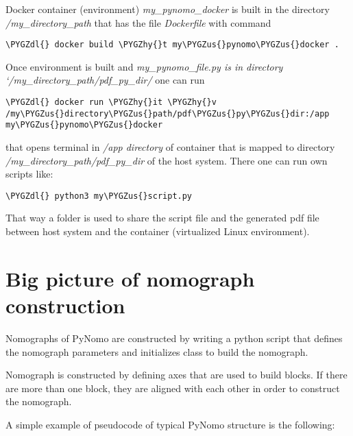 \documentclass[a4paper,11pt,english]{sphinxmanual}
\def\PYGZus{\char`\_}
\def\PYGZdl{\char`\$}
\def\PYGZhy{\char`\-}
\begin{document}
Docker container (environment) \emph{my\_pynomo\_docker} is built in the directory \emph{/my\_directory\_path} that has the file \emph{Dockerfile} with command

\begin{Verbatim}[commandchars=\\\{\},formatcom=\scriptsize]
\PYGZdl{} docker build \PYGZhy{}t my\PYGZus{}pynomo\PYGZus{}docker .
\end{Verbatim}

Once environment is built and \emph{my\_pynomo\_file.py is in directory {}`/my\_directory\_path/pdf\_py\_dir/} one can run

\begin{Verbatim}[commandchars=\\\{\},formatcom=\scriptsize]
\PYGZdl{} docker run \PYGZhy{}it \PYGZhy{}v /my\PYGZus{}directory\PYGZus{}path/pdf\PYGZus{}py\PYGZus{}dir:/app my\PYGZus{}pynomo\PYGZus{}docker
\end{Verbatim}

that opens terminal in \emph{/app directory} of container that is mapped to directory \emph{/my\_directory\_path/pdf\_py\_dir} of the host system.
There one can run own scripts like:

\begin{Verbatim}[commandchars=\\\{\},formatcom=\scriptsize]
\PYGZdl{} python3 my\PYGZus{}script.py
\end{Verbatim}

That way a folder is used to share the script file and the generated pdf file between host system and the container (virtualized
Linux environment).


\chapter{Big picture of nomograph construction}
\label{main_page:big-picture-of-nomograph-construction}\label{main_page::doc}
Nomographs of PyNomo are
constructed by writing a python script that defines the nomograph parameters and
initializes class  to build the nomograph.

Nomograph is constructed by defining axes that are used to
build blocks. If there are more than one block,  they are aligned with each other in order to
construct the nomograph.

A simple example of pseudocode of typical PyNomo structure is the
following:
\end{document}

